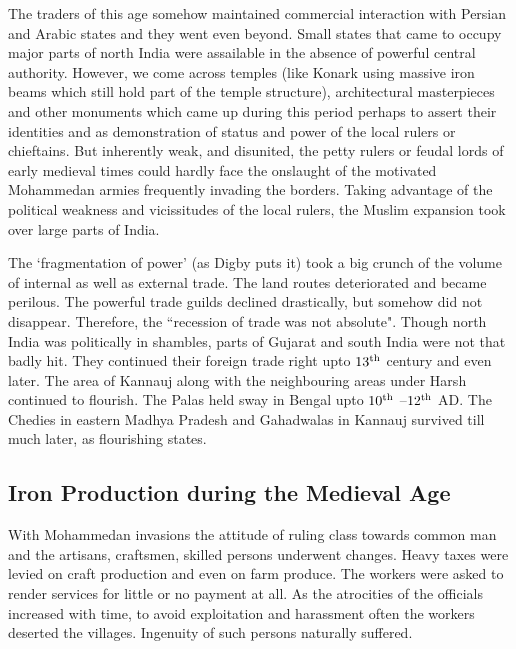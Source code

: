 The traders of this age somehow maintained commercial interaction with Persian and Arabic states and they went even beyond. Small states that came to occupy major parts of north India were assailable in the absence of powerful central authority. However, we come across temples (like Konark using massive iron beams which still hold part of the temple structure), architectural masterpieces and other monuments which came up during this period perhaps to assert their identities and as demonstration of status and power of the local rulers or chieftains. But inherently weak, and disunited, the petty rulers or feudal lords of early medieval times could hardly face the onslaught of the motivated Mohammedan armies frequently invading the borders. Taking advantage of the political weakness and vicissitudes of the local rulers, the Muslim expansion took over large parts of India. 

The `fragmentation of power' (as Digby puts it) took a big crunch of the volume of internal as well as external trade. The land routes deteriorated and became perilous. The powerful trade guilds declined drastically, but somehow did not disappear. Therefore, the ``recession of trade was not absolute". Though north India was politically in shambles, parts of Gujarat and south India were not that badly hit. They continued their foreign trade right upto $13^{\rm th}$ century and even later. The area of Kannauj along with the neighbouring areas under Harsh continued to flourish. The Palas held sway in Bengal upto $10^{\rm th}$ –$12^{\rm th}$ AD. The Chedies in eastern Madhya Pradesh and Gahadwalas in Kannauj survived till much later, as flourishing states.

\vspace{-.3cm}

\subsection*{Iron Production during the Medieval Age}\label{chapter8-subsection-3}

\vspace{-.2cm}

With Mohammedan invasions the attitude of ruling class towards common man and the artisans, craftsmen, skilled persons underwent changes. Heavy taxes were levied on craft production and even on farm produce. The workers were asked to render services for little or no payment at all. As the atrocities of the officials increased with time, to avoid exploitation and harassment often the workers deserted the villages. Ingenuity of such persons naturally suffered. 

